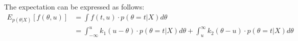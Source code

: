 The expectation can be expressed as follows:\\
\begin{align*}
    E_{p(\theta|X)}[f(\theta,u)] &= \int f(t,u)\cdot p(\theta=t|X)d\theta\\
    &= \int_{-\infty}^{u} k_1(u-\theta)\cdot p(\theta=t|X)d\theta + \int_{u}^{\infty} k_2(\theta-u)\cdot p(\theta=t|X)d\theta
\end{align*}